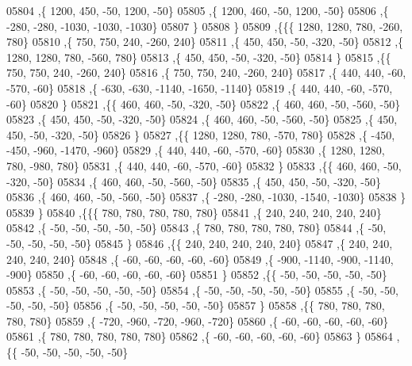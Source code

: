 \begin{DoxyCode}
05804     ,\{  1200,   450,   -50,  1200,   -50\}
05805     ,\{  1200,   460,   -50,  1200,   -50\}
05806     ,\{  -280,  -280, -1030, -1030, -1030\}
05807     \}
05808    \}
05809   ,\{\{\{  1280,  1280,   780,  -260,   780\}
05810     ,\{   750,   750,   240,  -260,   240\}
05811     ,\{   450,   450,   -50,  -320,   -50\}
05812     ,\{  1280,  1280,   780,  -560,   780\}
05813     ,\{   450,   450,   -50,  -320,   -50\}
05814     \}
05815    ,\{\{   750,   750,   240,  -260,   240\}
05816     ,\{   750,   750,   240,  -260,   240\}
05817     ,\{   440,   440,   -60,  -570,   -60\}
05818     ,\{  -630,  -630, -1140, -1650, -1140\}
05819     ,\{   440,   440,   -60,  -570,   -60\}
05820     \}
05821    ,\{\{   460,   460,   -50,  -320,   -50\}
05822     ,\{   460,   460,   -50,  -560,   -50\}
05823     ,\{   450,   450,   -50,  -320,   -50\}
05824     ,\{   460,   460,   -50,  -560,   -50\}
05825     ,\{   450,   450,   -50,  -320,   -50\}
05826     \}
05827    ,\{\{  1280,  1280,   780,  -570,   780\}
05828     ,\{  -450,  -450,  -960, -1470,  -960\}
05829     ,\{   440,   440,   -60,  -570,   -60\}
05830     ,\{  1280,  1280,   780,  -980,   780\}
05831     ,\{   440,   440,   -60,  -570,   -60\}
05832     \}
05833    ,\{\{   460,   460,   -50,  -320,   -50\}
05834     ,\{   460,   460,   -50,  -560,   -50\}
05835     ,\{   450,   450,   -50,  -320,   -50\}
05836     ,\{   460,   460,   -50,  -560,   -50\}
05837     ,\{  -280,  -280, -1030, -1540, -1030\}
05838     \}
05839    \}
05840   ,\{\{\{   780,   780,   780,   780,   780\}
05841     ,\{   240,   240,   240,   240,   240\}
05842     ,\{   -50,   -50,   -50,   -50,   -50\}
05843     ,\{   780,   780,   780,   780,   780\}
05844     ,\{   -50,   -50,   -50,   -50,   -50\}
05845     \}
05846    ,\{\{   240,   240,   240,   240,   240\}
05847     ,\{   240,   240,   240,   240,   240\}
05848     ,\{   -60,   -60,   -60,   -60,   -60\}
05849     ,\{  -900, -1140,  -900, -1140,  -900\}
05850     ,\{   -60,   -60,   -60,   -60,   -60\}
05851     \}
05852    ,\{\{   -50,   -50,   -50,   -50,   -50\}
05853     ,\{   -50,   -50,   -50,   -50,   -50\}
05854     ,\{   -50,   -50,   -50,   -50,   -50\}
05855     ,\{   -50,   -50,   -50,   -50,   -50\}
05856     ,\{   -50,   -50,   -50,   -50,   -50\}
05857     \}
05858    ,\{\{   780,   780,   780,   780,   780\}
05859     ,\{  -720,  -960,  -720,  -960,  -720\}
05860     ,\{   -60,   -60,   -60,   -60,   -60\}
05861     ,\{   780,   780,   780,   780,   780\}
05862     ,\{   -60,   -60,   -60,   -60,   -60\}
05863     \}
05864    ,\{\{   -50,   -50,   -50,   -50,   -50\}

\end{DoxyCode}
